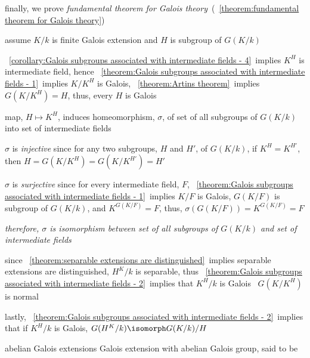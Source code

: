 \documentclass[17pt,landscape]{foils}
\begin{document}
{

\bit
\item
	finally, we prove \emph{fundamental theorem for Galois theory}\
	(\theoremname~\ref{theorem:fundamental theorem for Galois theory})

\vvitem
	assume $K/k$ is finite Galois extension
	and $H$ is subgroup of $G(K/k)$
	\bit
	\item
		\corollaryname~\ref{corollary:Galois subgroups associated with intermediate fields - 4}\
		implies $K^H$ is intermediate field,
		hence
		\theoremname~\ref{theorem:Galois subgroups associated with intermediate fields - 1}\
		implies
		$K/K^H$ is Galois,
		\theoremname~\ref{theorem:Artins theorem}\
		implies
		$G(K/K^H) = H$,
		thus,
		every $H$ is Galois

	\item
		map, $H\mapsto K^H$,
		induces homeomorphism, $\sigma$, of set of all subgroups of $G(K/k)$
		into set of intermediate fields

	\item
		$\sigma$ is \emph{injective}
		since
		for any two subgroups, $H$ and $H'$, of $G(K/k)$,
		if $K^H=K^{H'}$,
		then $H=G(K/K^H)=G(K/K^{H'})=H'$

	\item
		$\sigma$ is \emph{surjective}
		since
		for every intermediate field, $F$,
		\theoremname~\ref{theorem:Galois subgroups associated with intermediate fields - 1}\
		implies
		$K/F$ is Galois, $G(K/F)$ is subgroup of $G(K/k)$, and $K^{G(K/F)}=F$,
		thus,
		$\sigma(G(K/F)) = K^{G(K/F)}= F$

	\item
		\emph{therefore, $\sigma$ is isomorphism
		between
			set of all subgroups of $G(K/k)$
		and
			set of intermediate fields
			}

	\vitem
		since \theoremname~\ref{theorem:separable extensions are distinguished}\
		implies
		separable extensions are distinguished,
		$H^K/k$ is separable,
		thus
		\theoremname~\ref{theorem:Galois subgroups associated with intermediate fields - 2}\
		implies that $K^H/k$ is Galois \iaoi\ $G(K/K^H)$ is normal

	\vitem
		lastly,
		\theoremname~\ref{theorem:Galois subgroups associated with intermediate fields - 2}\
		implies that if $K^H/k$ is Galois,
		$G(H^K/k) \isomorph G(K/k) / H$
	\eit
\eit



\begin{mydefinition}{abelian Galois extensions}
	Galois extension with abelian Galois group,
	said to be 
\end{mydefinition}

}
\end{document}
